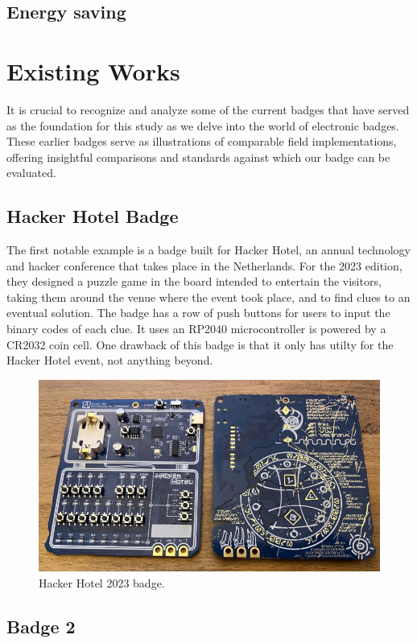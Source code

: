 \documentclass[english]{ist-thesis}
\begin{document}
\section{Energy saving}

\chapter{Existing Works}

It is crucial to recognize and analyze some of the current badges that have served as the foundation for this study as we delve into the world of electronic badges. These earlier badges serve as illustrations of comparable field implementations, offering insightful comparisons and standards against which our badge can be evaluated. 

\section{Hacker Hotel Badge}

The first notable example is a badge built for Hacker Hotel, an annual technology and hacker conference that takes place in the Netherlands. For the 2023 edition, they designed a puzzle game in the board intended to entertain the visitors, taking them around the venue where the event took place, and to find clues to an eventual solution. The badge has a row of push buttons for users to input the binary codes of each clue. It uses an RP2040 microcontroller is powered by a CR2032 coin cell. One drawback of this badge is that it only has utilty for the Hacker Hotel event, not anything beyond. 

\begin{figure}[ht]
	\centering
	\includegraphics[width = 0.8\linewidth]{images/hacker_hotel.jpg}
	\caption{Hacker Hotel 2023 badge.}
	\label{fig:hacker_hotel}
\end{figure}

\section{Badge 2}
\end{document}
